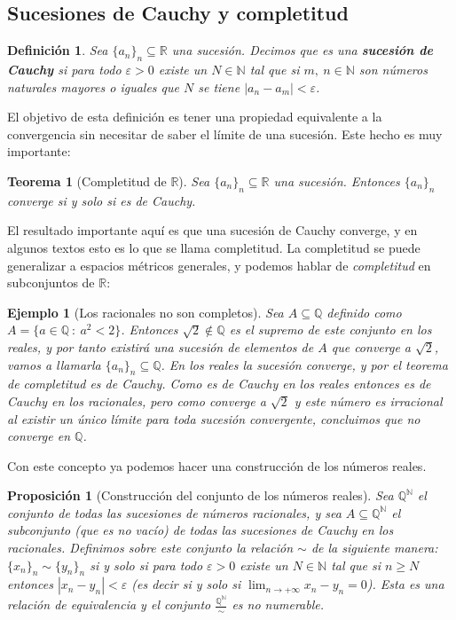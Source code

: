 \documentclass{article}
\newtheorem{theorem}{Teorema}
\newtheorem{prop}{Proposición}
\newtheorem{define}{Definición}
\newtheorem{ejem}{Ejemplo}
\newcommand{\reales}{\mathbb{R}}
\newcommand{\naturales}{\mathbb{N}}
\newcommand{\racionales}{\mathbb{Q}}
\newcommand{\sucesion}[1]{\{ #1 _n \}_n}
\newcommand{\sucreal}[1]{\{ #1 _n \}_n \subseteq \reales}
\newcommand{\limiten}[1]{\lim_{n \rightarrow +\infty} #1}
\begin{document}
\subsection{Sucesiones de Cauchy y completitud}
\begin{define}
	Sea $\sucreal{a}$ una sucesión. Decimos que es una \textbf{sucesión de Cauchy} si para todo $\varepsilon > 0$ existe un $N \in \naturales$ tal que si $m,\ n \in \naturales$ son números naturales mayores o iguales que $N$ se tiene $|a_n - a_m| < \varepsilon$.
\end{define}
El objetivo de esta definición es tener una propiedad equivalente a la convergencia sin necesitar de saber el límite de una sucesión. Este hecho es muy importante:
\begin{theorem}[Completitud de $\reales$]
	Sea $\sucreal{a}$ una sucesión. Entonces $\sucesion{a}$ converge si y solo si es de Cauchy.
\end{theorem}
El resultado importante aquí es que una sucesión de Cauchy converge, y en algunos textos esto es lo que se llama completitud.
La completitud se puede generalizar a espacios métricos generales, y podemos hablar de \textit{completitud} en subconjuntos de $\reales$:
\begin{ejem}[Los racionales no son completos]
	Sea $A \subseteq \racionales$ definido como $A = \{ a\in \racionales\ :\ a^2 < 2\}$. Entonces $\sqrt{2} \not\in \racionales$ es el supremo de este conjunto en los reales, y por tanto existirá una sucesión de elementos de $A$ que converge a $\sqrt{2}$, vamos a llamarla $\sucesion{a} \subseteq \racionales$. En los reales la sucesión converge, y por el teorema de completitud es de Cauchy. Como es de Cauchy en los reales entonces es de Cauchy en los racionales, pero como converge a $\sqrt{2}$ y este número es irracional al existir un único límite para toda sucesión convergente, concluimos que no converge en $\racionales$.
\end{ejem}
Con este concepto ya podemos hacer una construcción de los números reales.
\begin{prop}[Construcción del conjunto de los números reales]
	\label{prop_consreal1}
	Sea $\racionales ^ {\naturales}$ el conjunto de todas las sucesiones de números racionales, y sea $A \subseteq \racionales ^ {\naturales}$ el subconjunto (que es no vacío) de todas las sucesiones de Cauchy en los racionales. Definimos sobre este conjunto la relación $\sim$ de la siguiente manera: $\sucesion{x} \sim \sucesion{y}$ si y solo si para todo $\varepsilon > 0$ existe un $N \in \naturales$ tal que si $n \geq N$ entonces $|x_n - y_n| < \varepsilon$ (es decir si y solo si $\limiten{x_n - y_n} = 0$). Esta es una relación de equivalencia y el conjunto $\frac{\racionales ^ {\naturales}}{\sim}$ es no numerable.
\end{prop}
\end{document}
